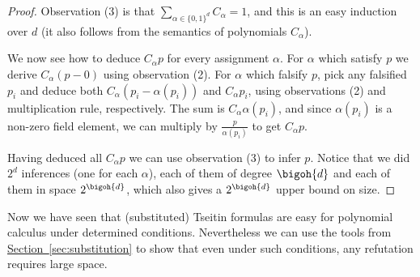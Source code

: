 \documentclass[11pt]{article}
\numberwithin{equation}{section}
\theoremstyle{definition}
\theoremstyle{plain}
\newcommand{\expref}[2]{\hyperref[#2]{#1~\ref{#2}}}
\begin{document}
\begin{proof}
Observation (3) is that $\sum_{\alpha\in\{0,1\}^{d}} C_{\alpha} = 1$,
and this is an easy induction over $d$ (it also follows from the
semantics of polynomials $C_\alpha$).

We now see how to deduce $C_{\alpha} p$ for every assignment $\alpha$.
%
For $\alpha$ which satisfy $p$ we derive $C_{\alpha}(p - 0)$ using observation (2).
%
For $\alpha$ which falsify $p$, pick any falsified $p_{i}$ and deduce
both $C_{\alpha} (p_{i}-\alpha(p_{i}))$ and $C_{\alpha}p_{i}$, using
observations (2) and multiplication rule, respectively. The sum is
$C_{\alpha}\alpha(p_{i})$, and since $\alpha(p_{i})$ is a non-zero
field element, we
can multiply by $\frac{p}{\alpha(p_{i})}$ to get $C_{\alpha}p$.
%

Having deduced all $C_{\alpha}p$ we can use observation (3) to infer $p$.
%
Notice that we did $2^{d}$ inferences (one for each $\alpha$), each of them of degree $\bigoh{d}$ and each of them in space $2^{\bigoh{d}}$, which also gives
%
a $2^{\bigoh{d}}$ upper bound %
on size.
\end{proof}

Now we have seen that (substituted) Tseitin formulas are easy for
polynomial calculus under determined conditions. Nevertheless we can
use the tools from \expref{Section}{sec:substitution} to show that even
under such conditions, any refutation requires large space.
\end{document}
